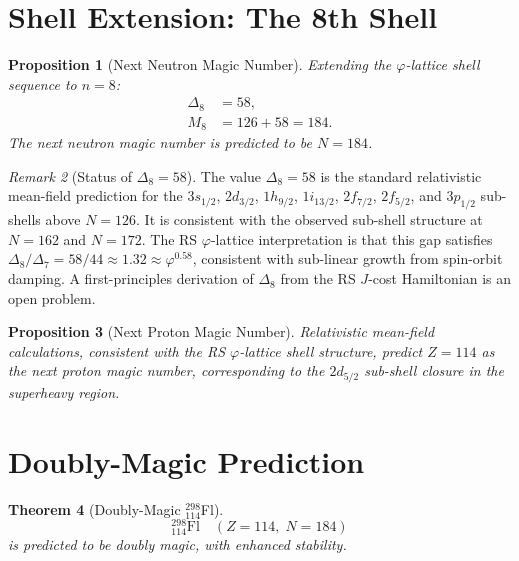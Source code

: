 \documentclass[12pt,a4paper]{article}
\newtheorem{theorem}{Theorem}[section]
\newtheorem{proposition}[theorem]{Proposition}
\theoremstyle{definition}
\theoremstyle{remark}
\newtheorem{remark}[theorem]{Remark}
\begin{document}
\section{Shell Extension: The 8th Shell}
\label{sec:extension}

\begin{proposition}[Next Neutron Magic Number]
\label{thm:next}
Extending the $\varphi$-lattice shell sequence to $n = 8$:
\begin{align}
  \Delta_8 &= 58, \label{eq:delta8}\\
  M_8 &= 126 + 58 = 184.
\end{align}
The next neutron magic number is predicted to be $N = 184$.
\end{proposition}

\begin{remark}[Status of $\Delta_8 = 58$]
The value $\Delta_8 = 58$ is the standard relativistic mean-field
prediction for the $3s_{1/2}$, $2d_{3/2}$, $1h_{9/2}$,
$1i_{13/2}$, $2f_{7/2}$, $2f_{5/2}$, and $3p_{1/2}$ sub-shells
above $N = 126$.  It is consistent with the observed sub-shell
structure at $N = 162$ and $N = 172$.  The RS $\varphi$-lattice
interpretation is that this gap satisfies $\Delta_8/\Delta_7 =
58/44 \approx 1.32 \approx \varphi^{0.58}$, consistent with
sub-linear growth from spin-orbit damping.  A first-principles
derivation of $\Delta_8$ from the RS $J$-cost Hamiltonian is
an open problem.
\end{remark}

\begin{proposition}[Next Proton Magic Number]
\label{prop:proton-magic}
Relativistic mean-field calculations, consistent with the RS
$\varphi$-lattice shell structure, predict $Z = 114$ as the
next proton magic number, corresponding to the $2d_{5/2}$
sub-shell closure in the superheavy region.
\end{proposition}

\section{Doubly-Magic Prediction}
\label{sec:doubly}

\begin{theorem}[Doubly-Magic ${}^{298}_{114}$Fl]
\label{thm:doubly}
\begin{equation}
  \boxed{{}^{298}_{114}\mathrm{Fl} \quad (Z = 114,\; N = 184)}
\end{equation}
is predicted to be doubly magic, with enhanced stability.
\end{theorem}
\end{document}

